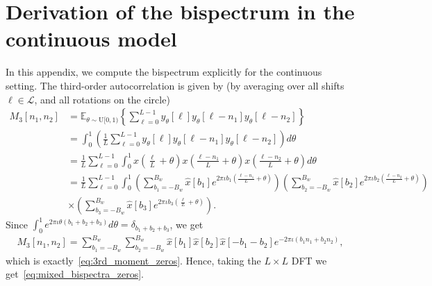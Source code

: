 \documentclass[english,12pt]{article}
\newcommand{\I}{\iota}
\newcommand{\tB}{B_w}
\newcommand{\E}{\mathbb{E}}
\numberwithin{equation}{section}
\numberwithin{thm}{section} %
\begin{document}
\section{Derivation of the bispectrum in the continuous model} \label{sec:continuous_bispectrum}

In this appendix, we compute the bispectrum explicitly for the continuous setting. The third-order autocorrelation is given by (by averaging over all shifts $\ell\in\mathcal{L}$, and all rotations on the circle)
\begin{equation}
\begin{split}
M_3[n_1,n_2] &= \E_{\theta\sim\text{U}[0,1)}\left\{ \sum_{\ell=0}^{L-1}  y_\theta[\ell] y_\theta[\ell-n_1] y_\theta[\ell-n_2]\right\} 
\\&=\int_{0}^{1}\left(\frac{1}{L}\sum_{\ell=0}^{L-1} y_\theta[\ell] y_\theta[\ell-n_1] y_\theta[\ell-n_2]\right)d\theta\\ 
&= \frac{1}{L}\sum_{\ell=0}^{L-1}\int_{0}^{1} x\left(\frac{\ell}{L} + \theta\right) x\left(\frac{\ell-n_1}{L} + \theta\right)
x\left(\frac{\ell-n_2}{L} + \theta\right)d\theta\\
&= \frac{1}{L}\sum_{\ell=0}^{L-1}\int_{0}^{1} 
\left(\sum_{b_1=-\tB}^{\tB}\hat{x}[b_1]e^{2\pi\I b_1 \left(\frac{\ell-n_1}{L} + \theta\right) }\right) 
\left(\sum_{b_2=-\tB}^{\tB}\hat{x}[b_2]e^{2\pi\I b_2 \left(\frac{\ell-n_2}{L} + \theta\right) } \right) \\
&\times \left(\sum_{b_3=-\tB}^{\tB}\hat{x}[b_3]e^{2\pi\I b_3 \left(\frac{\ell}{L} + \theta\right) }\right). 
\end{split}
\end{equation}
Since $\int_{0}^{1}e^{2\pi\I\theta(b_1+b_2+b_3)}d\theta=\delta_{b_1+b_2+b_3}$, we get 
\begin{equation}
\begin{split}
M_3[n_1,n_2] =   \sum_{b_1=-\tB}^{\tB}\sum_{b_2=-\tB}^{\tB} \hat{x}[b_1]\hat{x}[b_2]\hat{x}[-b_1-b_2]e^{-2\pi\I (b_1n_1+b_2n_2)},
\end{split}
\end{equation}
which is exactly~\eqref{eq:3rd_moment_zeros}. Hence, taking the $L\times L$ DFT we get~\eqref{eq:mixed_bispectra_zeros}.
\end{document}
